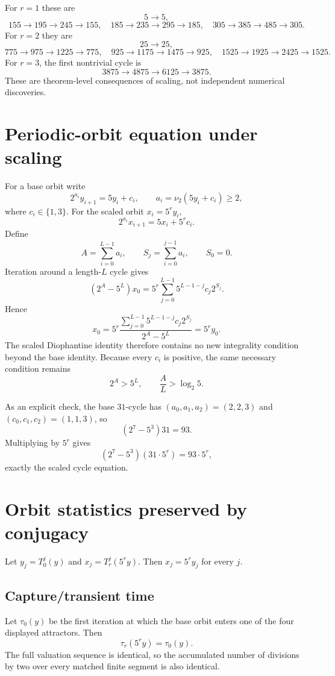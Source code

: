 \documentclass[11pt]{article}
\newcommand{\vTwo}{\nu_2}
\begin{document}
For $r=1$ these are
\[
5\to5,
\]
\[
155\to195\to245\to155,
\quad
185\to235\to295\to185,
\quad
305\to385\to485\to305.
\]
For $r=2$ they are
\[
25\to25,
\]
\[
775\to975\to1225\to775,
\quad
925\to1175\to1475\to925,
\quad
1525\to1925\to2425\to1525.
\]
For $r=3$, the first nontrivial cycle is
\[
3875\to4875\to6125\to3875.
\]
These are theorem-level consequences of scaling, not independent numerical discoveries.

\section{Periodic-orbit equation under scaling}
For a base orbit write
\begin{equation}
2^{a_i}y_{i+1}=5y_i+c_i,
\qquad a_i=\vTwo(5y_i+c_i)\ge2,
\label{eq:basecycle}
\end{equation}
where $c_i\in\{1,3\}$. For the scaled orbit $x_i=5^ry_i$,
\begin{equation}
2^{a_i}x_{i+1}=5x_i+5^r c_i.
\label{eq:scaledcycle}
\end{equation}
Define
\[
A=\sum_{i=0}^{L-1}a_i,\qquad
S_j=\sum_{i=0}^{j-1}a_i,\qquad S_0=0.
\]
Iteration around a length-$L$ cycle gives
\begin{equation}
(2^A-5^L)x_0
=5^r\sum_{j=0}^{L-1}5^{L-1-j}c_j2^{S_j}.
\label{eq:scaledcycleid}
\end{equation}
Hence
\begin{equation}
x_0
=5^r\frac{\sum_{j=0}^{L-1}5^{L-1-j}c_j2^{S_j}}{2^A-5^L}
=5^r y_0.
\label{eq:scaledx0}
\end{equation}
The scaled Diophantine identity therefore contains no new integrality condition beyond the base identity. Because every $c_i$ is positive, the same necessary condition remains
\begin{equation}
2^A>5^L,\qquad \frac{A}{L}>\log_2 5.
\label{eq:crit}
\end{equation}

As an explicit check, the base $31$-cycle has $(a_0,a_1,a_2)=(2,2,3)$ and $(c_0,c_1,c_2)=(1,1,3)$, so
\[
(2^7-5^3)31=93.
\]
Multiplying by $5^r$ gives
\[
(2^7-5^3)(31\cdot5^r)=93\cdot5^r,
\]
exactly the scaled cycle equation.

\section{Orbit statistics preserved by conjugacy}
Let $y_j=T_0^j(y)$ and $x_j=T_r^j(5^ry)$. Then $x_j=5^ry_j$ for every $j$.

\subsection{Capture/transient time}
Let $\tau_0(y)$ be the first iteration at which the base orbit enters one of the four displayed attractors. Then
\begin{equation}
\tau_r(5^ry)=\tau_0(y).
\label{eq:capture}
\end{equation}
The full valuation sequence is identical, so the accumulated number of divisions by two over every matched finite segment is also identical.
\end{document}
